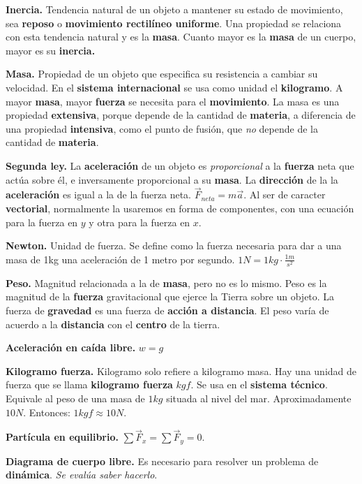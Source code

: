 \documentclass{article}
\begin{document}
\textbf{Inercia.} Tendencia natural de un objeto a mantener su estado de 
movimiento, sea \textbf{reposo} o \textbf{movimiento rectilíneo uniforme}. Una 
propiedad se relaciona con esta tendencia natural y es la \textbf{masa}. Cuanto
mayor es la \textbf{masa} de un cuerpo, mayor es su \textbf{inercia.}

\textbf{Masa.} Propiedad de un objeto que especifica su resistencia a cambiar su
velocidad. En el \textbf{sistema internacional} se usa como unidad el 
\textbf{kilogramo}. A mayor \textbf{masa}, mayor \textbf{fuerza} se necesita 
para el \textbf{movimiento}. La masa es una propiedad \textbf{extensiva}, porque
depende de la cantidad de \textbf{materia}, a diferencia de una propiedad 
\textbf{intensiva}, como el punto de fusión, que \textit{no} depende de la 
cantidad de \textbf{materia}.

\textbf{Segunda ley.} La \textbf{aceleración} de un objeto es 
\textit{proporcional} a la \textbf{fuerza} neta que actúa sobre él, e 
inversamente proporcional a su \textbf{masa}. La \textbf{dirección} de la 
la \textbf{aceleración} es igual a la de la fuerza neta. 
\(\vec{F}_{neta} = m\vec{a}\). Al ser de caracter \textbf{vectorial}, 
normalmente la usaremos en forma de componentes, con una ecuación para la fuerza
en \(y\) y otra para la fuerza en \(x\).

\textbf{Newton.} Unidad de fuerza. Se define como la fuerza necesaria para dar a
una masa de 1kg una aceleración de 1 metro por segundo. 
\(1N = 1kg \cdot \frac{1m}{s^2}\)

\textbf{Peso.} Magnitud relacionada a la de \textbf{masa}, pero no es lo mismo.
Peso es la magnitud de la \textbf{fuerza} gravitacional que ejerce la Tierra 
sobre un objeto. La fuerza de \textbf{gravedad} es una fuerza de 
\textbf{acción a distancia}. El peso varía de acuerdo a la \textbf{distancia} 
con el \textbf{centro} de la tierra.

\textbf{Aceleración en caída libre.} \(w = g\)

\textbf{Kilogramo fuerza.} Kilogramo solo refiere a kilogramo masa. Hay una 
unidad de fuerza que se llama \textbf{kilogramo fuerza} \(kgf\). Se usa en el
\textbf{sistema técnico}. Equivale al peso de una masa de \(1kg\) situada al 
nivel del mar. Aproximadamente \(10N\). Entonces: \(1kgf \approx 10N\).

\textbf{Partícula en equilibrio.} \(\sum\vec{F}_x = \sum\vec{F}_y = 0\).

\textbf{Diagrama de cuerpo libre.} Es necesario para resolver un problema de 
\textbf{dinámica}. \textit{Se evalúa saber hacerlo}. 
\end{document}
